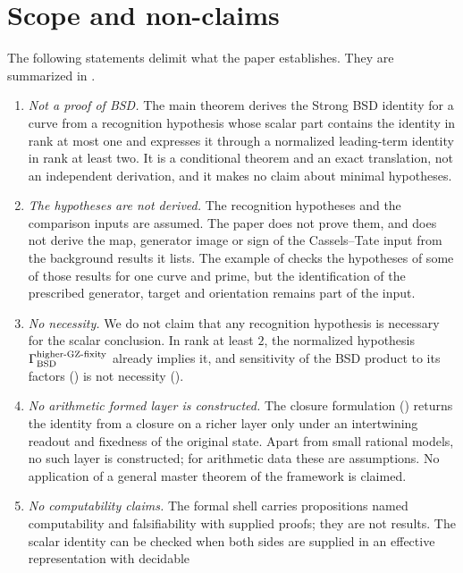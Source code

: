 \section{Scope and non-claims}\label{sec:scope}

The following statements delimit what the paper establishes.  They are
summarized in .

\begin{enumerate}
\item \emph{Not a proof of BSD.}  The main theorem derives the Strong BSD
  identity for a curve from a recognition hypothesis whose scalar part
  contains the identity in rank at most one and expresses it through a
  normalized leading-term identity in rank at least two.  It is a
  conditional theorem and an exact translation, not an independent
  derivation, and it makes no claim about minimal hypotheses.
\item \emph{The hypotheses are not derived.}  The recognition hypotheses
  and the comparison inputs are assumed.  The paper does not prove them,
  and does not derive the map, generator image or sign of the
  Cassels--Tate input from the background results it lists.  The example
  of  checks the hypotheses of some of those results
  for one curve and prime, but the identification of the prescribed
  generator, target and orientation remains part of the input.
\item \emph{No necessity.}  We do not claim that any recognition
  hypothesis is necessary for the scalar conclusion.  In rank at least
  $2$, the normalized hypothesis $\Gamma_{\mathrm{BSD}}^{\mathrm{higher\text{-}GZ\text{-}fixity}}$ already implies it, and
  sensitivity of the BSD product to its factors
  () is not necessity
  ().
\item \emph{No arithmetic formed layer is constructed.}  The closure formulation
  () returns the identity from a closure on a
  richer layer only under an intertwining readout and fixedness of the
  original state.  Apart from small rational models, no such layer is
  constructed; for arithmetic data these are assumptions.  No application of
  a general master theorem of the framework is claimed.
\item \emph{No computability claims.}  The formal shell carries
  propositions named computability and falsifiability with supplied
  proofs; they are not results.  The scalar identity can be checked when
  both sides are supplied in an effective representation with decidable

\end{enumerate}
